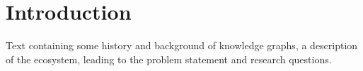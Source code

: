 
\chapter{Introduction}


Text containing some history and background of knowledge graphs, a description of the ecosystem, leading to the problem statement and research questions.

